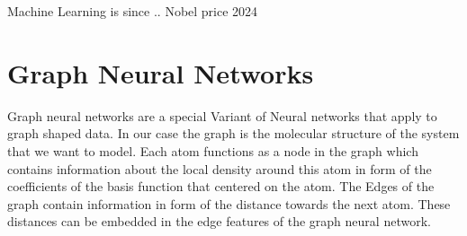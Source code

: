Machine Learning is since .. Nobel price 2024


\section{Graph Neural Networks}
Graph neural networks are a special Variant of Neural networks that apply to graph shaped data.
In our case the graph is the molecular structure of the system that we want to model. Each atom functions as a node in the graph which contains information about the local density around this atom in form of the coefficients of the basis function that centered on the atom. The Edges of the graph contain information in form of the distance towards the next atom. These distances can be embedded in the edge features of the graph neural network.